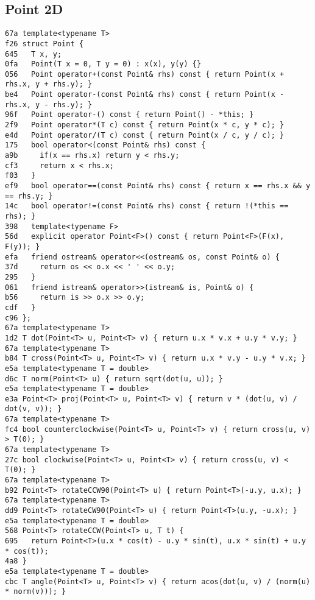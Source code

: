 \documentclass[10pt, a4paper, twoside]{article}
\begin{document}
\subsection{Point 2D}
\begin{lstlisting}
67a template<typename T>
f26 struct Point {
645   T x, y;
0fa   Point(T x = 0, T y = 0) : x(x), y(y) {}
056   Point operator+(const Point& rhs) const { return Point(x + rhs.x, y + rhs.y); }
be4   Point operator-(const Point& rhs) const { return Point(x - rhs.x, y - rhs.y); }
96f   Point operator-() const { return Point() - *this; }
2f9   Point operator*(T c) const { return Point(x * c, y * c); }
e4d   Point operator/(T c) const { return Point(x / c, y / c); }
175   bool operator<(const Point& rhs) const {
a9b     if(x == rhs.x) return y < rhs.y;
cf3     return x < rhs.x;
f03   }
ef9   bool operator==(const Point& rhs) const { return x == rhs.x && y == rhs.y; }
14c   bool operator!=(const Point& rhs) const { return !(*this == rhs); }
398   template<typename F>
56d   explicit operator Point<F>() const { return Point<F>(F(x), F(y)); }
efa   friend ostream& operator<<(ostream& os, const Point& o) {
37d     return os << o.x << ' ' << o.y;
295   }
061   friend istream& operator>>(istream& is, Point& o) {
b56     return is >> o.x >> o.y;
cdf   }
c96 };
67a template<typename T>
1d2 T dot(Point<T> u, Point<T> v) { return u.x * v.x + u.y * v.y; }
67a template<typename T>
b84 T cross(Point<T> u, Point<T> v) { return u.x * v.y - u.y * v.x; }
e5a template<typename T = double>
d6c T norm(Point<T> u) { return sqrt(dot(u, u)); }
e5a template<typename T = double>
e3a Point<T> proj(Point<T> u, Point<T> v) { return v * (dot(u, v) / dot(v, v)); }
67a template<typename T>
fc4 bool counterclockwise(Point<T> u, Point<T> v) { return cross(u, v) > T(0); }
67a template<typename T>
27c bool clockwise(Point<T> u, Point<T> v) { return cross(u, v) < T(0); }
67a template<typename T>
b92 Point<T> rotateCCW90(Point<T> u) { return Point<T>(-u.y, u.x); }
67a template<typename T>
dd9 Point<T> rotateCW90(Point<T> u) { return Point<T>(u.y, -u.x); }
e5a template<typename T = double>
568 Point<T> rotateCCW(Point<T> u, T t) {
695   return Point<T>(u.x * cos(t) - u.y * sin(t), u.x * sin(t) + u.y * cos(t));
4a8 }
e5a template<typename T = double>
cbc T angle(Point<T> u, Point<T> v) { return acos(dot(u, v) / (norm(u) * norm(v))); }
\end{lstlisting}
\end{document}
